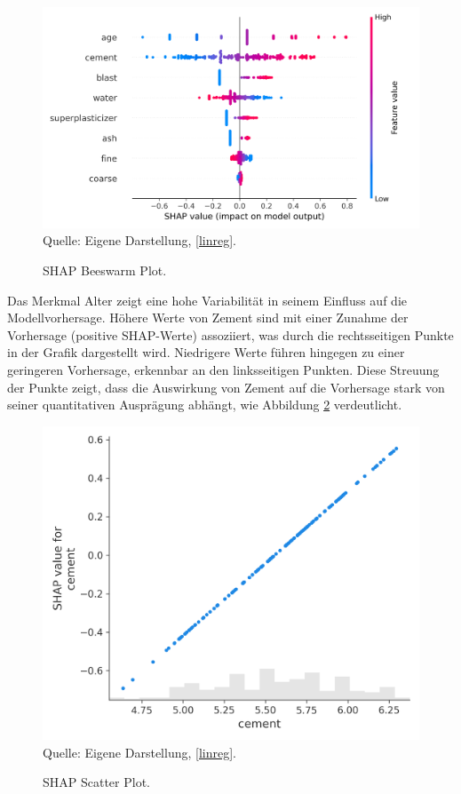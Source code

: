 \begin{figure}[!h]
    \caption{SHAP Beeswarm Plot.}
    \includegraphics[width=1\textwidth]{../scripts/images/shap_beeswarm_plot.png}
    Quelle: Eigene Darstellung, \ref{linreg}.
    \label{pic:shap_beeswarm}
\end{figure}

Das Merkmal Alter zeigt eine hohe Variabilität in seinem Einfluss auf die Modellvorhersage. 
Höhere Werte von Zement sind mit einer Zunahme der Vorhersage (positive SHAP-Werte) assoziiert, 
was durch die rechtsseitigen Punkte in der Grafik dargestellt wird. 
Niedrigere Werte führen hingegen zu einer geringeren Vorhersage, 
erkennbar an den linksseitigen Punkten. Diese Streuung der Punkte zeigt, 
dass die Auswirkung von Zement auf die Vorhersage stark von seiner quantitativen Ausprägung abhängt, 
wie Abbildung \ref{pic:shap_scatter} verdeutlicht. 

\begin{figure}[!h]
    \caption{SHAP Scatter Plot.}
    \includegraphics[width=1\textwidth]{../scripts/images/shap_scatter_plot.png}
    Quelle: Eigene Darstellung, \ref{linreg}.
    \label{pic:shap_scatter}
\end{figure}


